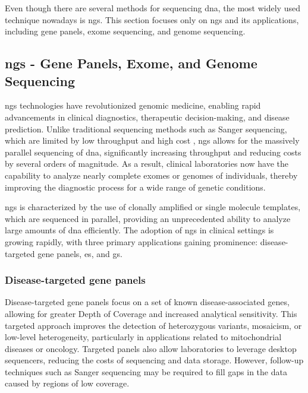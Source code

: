 Even though there are several methods for sequencing \ac{dna}, the most widely used technique nowadays is \acl{ngs}. This section focuses only on \ac{ngs} and its applications, including gene panels, exome sequencing, and genome sequencing.

\subsection{\acl{ngs} - Gene Panels, Exome, and Genome Sequencing} \label{subsec:ngs_gp_es_gs}


\acl{ngs} technologies have revolutionized genomic medicine, enabling rapid advancements in clinical diagnostics, therapeutic decision-making, and disease prediction. Unlike traditional sequencing methods such as Sanger sequencing, which are limited by low throughput and high cost \cite{cost}, \ac{ngs} allows for the massively parallel sequencing of \ac{dna}, significantly increasing throughput and reducing costs by several orders of magnitude. As a result, clinical laboratories now have the capability to analyze nearly complete exomes or genomes of individuals, thereby improving the diagnostic process for a wide range of genetic conditions. \cite{Rehm2013}

\ac{ngs} is characterized by the use of clonally amplified or single molecule templates, which are sequenced in parallel, providing an unprecedented ability to analyze large amounts of \ac{dna} efficiently. The adoption of \ac{ngs} in clinical settings is growing rapidly, with three primary applications gaining prominence: disease-targeted gene panels, \ac{es}, and \ac{gs}. \cite{Rehm2013}

\subsubsection{\textbf{Disease-targeted gene panels}} \label{subsubsubsec:ngs_panels}

Disease-targeted gene panels focus on a set of known disease-associated genes, allowing for greater Depth of Coverage and increased analytical sensitivity. This targeted approach improves the detection of heterozygous variants, mosaicism, or low-level heterogeneity, particularly in applications related to mitochondrial diseases or oncology. Targeted panels also allow laboratories to leverage desktop sequencers, reducing the costs of sequencing and data storage. However, follow-up techniques such as Sanger sequencing may be required to fill gaps in the data caused by regions of low coverage. \cite{Rehm2013}

